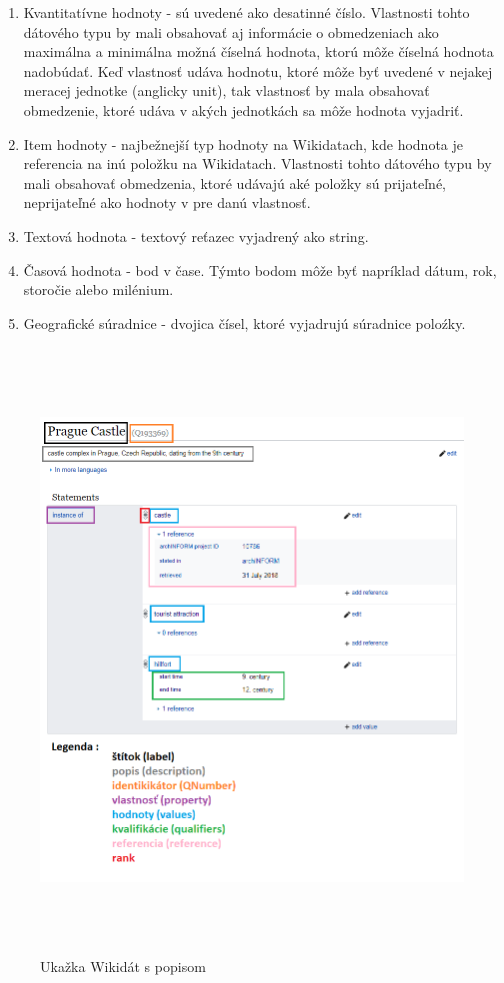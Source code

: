 \begin{enumerate}
    \item Kvantitatívne hodnoty - sú uvedené ako desatinné číslo.
          Vlastnosti tohto dátového typu by mali obsahovať aj informácie o obmedzeniach ako
          maximálna a minimálna možná číselná hodnota, ktorú môže číselná hodnota nadobúdať. Keď vlastnosť udáva hodnotu, ktoré môže byť
          uvedené v nejakej meracej jednotke (anglicky unit),
          tak vlastnosť by mala obsahovať obmedzenie, ktoré udáva v akých jednotkách sa môže hodnota vyjadriť.
    \item Item  hodnoty -  najbežnejší typ hodnoty na Wikidatach, kde hodnota je referencia
          na inú položku na Wikidatach. Vlastnosti tohto dátového typu by mali obsahovať obmedzenia, ktoré udávajú  aké položky sú prijateľné, neprijateľné ako hodnoty v pre danú vlastnosť.
    \item Textová hodnota - textový reťazec vyjadrený ako string.
    \item Časová hodnota - bod v čase. Týmto bodom môže byť napríklad dátum, rok, storočie alebo milénium.
    \item Geografické súradnice - dvojica čísel, ktoré vyjadrujú súradnice poloźky.
\end{enumerate}

\begin{figure}[p]\centering
    \includegraphics[width=140mm, height=160mm]{../img/ukazka-wikidata.png}
    \caption{Ukažka Wikidát s popisom}
\end{figure}

